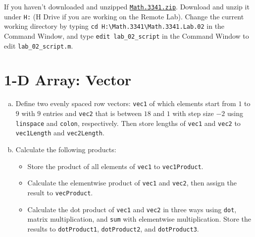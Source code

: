 If you haven't downloaded and unzipped \href{https://libaoj.in/courses/2021f/MATH3341/zip/Math.3341.zip}{\texttt{Math.3341.zip}}. Download and unzip it under \verb|H:| (H Drive if you are working on the Remote Lab). Change the current working directory by typing \verb|cd H:\Math.3341\Math.3341.Lab.02| in the Command Window, and type \verb|edit lab_02_script| in the Command Window to edit \verb|lab_02_script.m|.

\section{1-D Array: Vector}
\begin{enumerate}[(a)]
  \item Define two evenly spaced row vectors: \verb|vec1| of which elements start from $1$ to $9$ with $9$ entries and \verb|vec2| that is between $18$ and $1$ with step size $-2$ using \verb|linspace| and \verb|colon|, respectively. Then store lengths of \verb|vec1| and \verb|vec2| to \verb|vec1Length| and \verb|vec2Length|.
  \item Calculate the following products:
    \begin{itemize}
      \item Store the product of all elements of \verb|vec1| to \verb|vec1Product|.
      \item Calculate the elementwise product of \verb|vec1| and \verb|vec2|, then assign the result to \verb|vecProduct|.
      \item Calculate the dot product of \verb|vec1| and \verb|vec2| in three ways using \verb|dot|, matrix multiplication, and \verb|sum| with elementwise multiplication. Store the results to \verb|dotProduct1|, \verb|dotProduct2|, and \verb|dotProduct3|.
    \end{itemize}
\end{enumerate}

